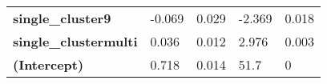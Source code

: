 \documentclass[]{article}
\begin{document}
\begin{longtable}[c]{@{}lllll@{}}
\begin{minipage}[t]{0.31\columnwidth}
\textbf{single\_cluster9}
\strut\end{minipage} &
\begin{minipage}[t]{0.13\columnwidth}\raggedright\strut
-0.069
\strut\end{minipage} &
\begin{minipage}[t]{0.16\columnwidth}\raggedright\strut
0.029
\strut\end{minipage} &
\begin{minipage}[t]{0.12\columnwidth}\raggedright\strut
-2.369
\strut\end{minipage} &
\begin{minipage}[t]{0.12\columnwidth}\raggedright\strut
0.018
\strut\end{minipage}\tabularnewline
\begin{minipage}[t]{0.31\columnwidth}\raggedright\strut
\textbf{single\_clustermulti}
\strut\end{minipage} &
\begin{minipage}[t]{0.13\columnwidth}\raggedright\strut
0.036
\strut\end{minipage} &
\begin{minipage}[t]{0.16\columnwidth}\raggedright\strut
0.012
\strut\end{minipage} &
\begin{minipage}[t]{0.12\columnwidth}\raggedright\strut
2.976
\strut\end{minipage} &
\begin{minipage}[t]{0.12\columnwidth}\raggedright\strut
0.003
\strut\end{minipage}\tabularnewline
\begin{minipage}[t]{0.31\columnwidth}\raggedright\strut
\textbf{(Intercept)}
\strut\end{minipage} &
\begin{minipage}[t]{0.13\columnwidth}\raggedright\strut
0.718
\strut\end{minipage} &
\begin{minipage}[t]{0.16\columnwidth}\raggedright\strut
0.014
\strut\end{minipage} &
\begin{minipage}[t]{0.12\columnwidth}\raggedright\strut
51.7
\strut\end{minipage} &
\begin{minipage}[t]{0.12\columnwidth}\raggedright\strut
0
\strut\end{minipage}\tabularnewline
\bottomrule
\end{longtable}
\end{document}
